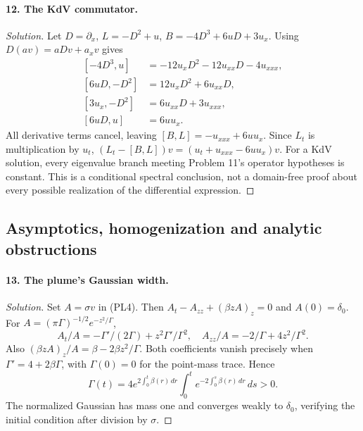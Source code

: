\Needspace{30mm}
\paragraph{12. The KdV commutator.}
\begin{proof}[Solution]
Let $D=\partial_x$, $L=-D^2+u$,
$B=-4D^3+6uD+3u_x$.
Using $D(av)=aDv+a_xv$ gives
\[
\begin{aligned}
 [-4D^3,u]&=-12u_xD^2-12u_{xx}D-4u_{xxx},\\
 [6uD,-D^2]&=12u_xD^2+6u_{xx}D,\\
 [3u_x,-D^2]&=6u_{xx}D+3u_{xxx},\\
 [6uD,u]&=6uu_x .
\end{aligned}
\]
All derivative terms cancel, leaving $[B,L]=-u_{xxx}+6uu_x$.
Since $L_t$ is multiplication by $u_t$,
$(L_t-[B,L])v=(u_t+u_{xxx}-6uu_x)v$.
For a KdV solution, every eigenvalue branch meeting Problem 11's
operator hypotheses is constant.
This is a conditional spectral conclusion, not a domain-free proof
about every possible realization of the differential expression.
\end{proof}

\Needspace{35mm}
\subsection{Asymptotics, homogenization and analytic obstructions}
\Needspace{30mm}
\paragraph{13. The plume's Gaussian width.}
\begin{proof}[Solution]
Set $A=\sigma v$ in (PL4). Then
$A_t-A_{zz}+(\beta zA)_z=0$ and $A(0)=\delta_0$.
For $A=(\pi\Gamma)^{-1/2}e^{-z^2/\Gamma}$,
\[
 A_t/A=-\Gamma'/(2\Gamma)+z^2\Gamma'/\Gamma^2,\quad
 A_{zz}/A=-2/\Gamma+4z^2/\Gamma^2.
\]
Also $(\beta zA)_z/A=\beta-2\beta z^2/\Gamma$.
Both coefficients vanish precisely when
$\Gamma'=4+2\beta\Gamma$, with $\Gamma(0)=0$ for the point-mass trace.
Hence
\[
 \Gamma(t)=4e^{2\int_0^t\beta(r)\,dr}
                \int_0^te^{-2\int_0^s\beta(r)\,dr}\,ds>0 .
\]
The normalized Gaussian has mass one and converges weakly to $\delta_0$,
verifying the initial condition after division by $\sigma$.
\end{proof}

\Needspace{30mm}
